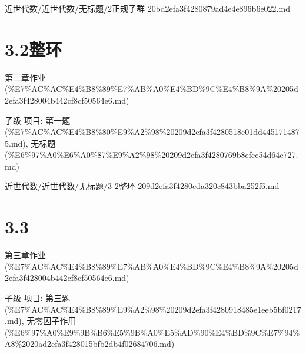 \begin{note}[来源路径]

近世代数/近世代数/无标题/2正规子群 20bd2efa3f4280879ad4e4e896b6e022.md

\end{note}

\section*{3.2整环}

\begin{note}[来源上级主题]

第三章作业 (\%E7\%AC\%AC\%E4\%B8\%89\%E7\%AB\%A0\%E4\%BD\%9C\%E4\%B8\%9A\%20205d2efa3f428004b442cf8cf50564e6.md)

\end{note}

\begin{homework}

子级 项目: 第一题 (\%E7\%AC\%AC\%E4\%B8\%80\%E9\%A2\%98\%20209d2efa3f4280518e01dd4451714875.md), 无标题 (\%E6\%97\%A0\%E6\%A0\%87\%E9\%A2\%98\%20209d2efa3f4280769b8efec54d64c727.md)

\end{homework}

\begin{note}[来源路径]

近世代数/近世代数/无标题/3 2整环 209d2efa3f4280cda320c843bba252f6.md

\end{note}

\section*{3.3}

\begin{note}[来源上级主题]

第三章作业 (\%E7\%AC\%AC\%E4\%B8\%89\%E7\%AB\%A0\%E4\%BD\%9C\%E4\%B8\%9A\%20205d2efa3f428004b442cf8cf50564e6.md)

\end{note}

\begin{homework}

子级 项目: 第三题 (\%E7\%AC\%AC\%E4\%B8\%89\%E9\%A2\%98\%20209d2efa3f4280918485e1eeb5bf0217.md), 无零因子作用 (\%E6\%97\%A0\%E9\%9B\%B6\%E5\%9B\%A0\%E5\%AD\%90\%E4\%BD\%9C\%E7\%94\%A8\%2020ad2efa3f428015bfb2db4f02684706.md)

\end{homework}

